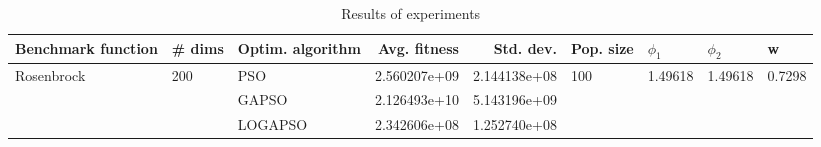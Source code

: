\begin{table}
\centering
\caption{Results of experiments}
\begin{tabular}{lllrrllll}
\toprule
         Benchmark function &              \# dims & Optim. algorithm &  Avg. fitness &    Std. dev. &            Pop. size &               $\phi_{1}$ &               $\phi_{2}$ &                       w \\
\midrule
\multirow{3}{*}{Rosenbrock} & \multirow{3}{*}{200} &              PSO &  2.560207e+09 & 2.144138e+08 & \multirow{3}{*}{100} & \multirow{3}{*}{1.49618} & \multirow{3}{*}{1.49618} & \multirow{3}{*}{0.7298} \\
                            &                      &            GAPSO &  2.126493e+10 & 5.143196e+09 &                      &                          &                          &                         \\
                            &                      &          LOGAPSO &  2.342606e+08 & 1.252740e+08 &                      &                          &                          &                         \\
\bottomrule
\end{tabular}
\end{table}
